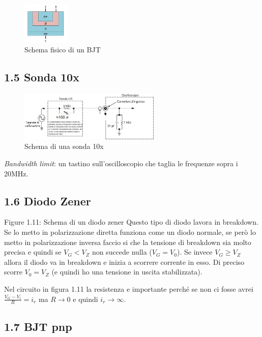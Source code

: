 \documentclass[
]{article}
\begin{document}
\begin{figure}
\centering
\includegraphics[width=0.2\textwidth,height=\textheight]{immagini/9.png}
\caption{Schema fisico di un BJT}
\end{figure}

\subsection{1.5 Sonda 10x}\label{sonda-10x}

\begin{figure}
\centering
\includegraphics[width=0.6\textwidth,height=\textheight]{immagini/10.png}
\caption{Schema di una sonda 10x}
\end{figure}

\emph{Bandwidth limit}: un tastino sull'oscilloscopio che taglia le
frequenze sopra i 20MHz.\newpage

\subsection{1.6 Diodo Zener}\label{diodo-zener}

Figure 1.11: Schema di un diodo zener Questo tipo di diodo lavora in
breakdown. Se lo metto in polarizzazione diretta funziona come un diodo
normale, se però lo metto in polarizzazione inversa faccio si che la
tensione di breakdown sia molto precisa e quindi se \(V_{G}<V_{Z}\) non
succede nulla (\(V_{G}=V_{0}\)). Se invece \(V_{G}\geq V_{Z}\) allora il
diodo va in breakdown e inizia a scorrere corrente in esso. Di preciso
scorre \(V_{0}=V_{Z}\) (e quindi ho una tensione in uscita
stabilizzata).

Nel circuito in figura 1.11 la resistenza e importante perché se non ci
fosse avrei \(\frac{V_{G}-V_{i}}{R}=i_{r}\) ma \(R\to 0\) e quindi
\(i_{r}\to\infty\).

\subsection{1.7 BJT pnp}\label{bjt-pnp}
\end{document}
